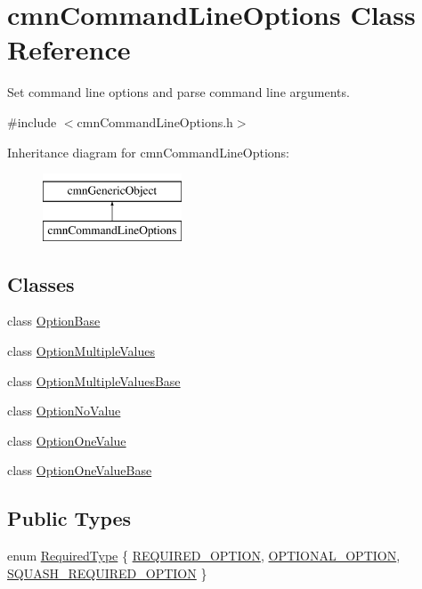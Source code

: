 \hypertarget{classcmn_command_line_options}{\section{cmn\-Command\-Line\-Options Class Reference}
\label{classcmn_command_line_options}
}


Set command line options and parse command line arguments.  




{\ttfamily \#include $<$cmn\-Command\-Line\-Options.\-h$>$}

Inheritance diagram for cmn\-Command\-Line\-Options\-:\begin{figure}[H]
\begin{center}
\leavevmode
\includegraphics[height=2.000000cm]{d7/de9/classcmn_command_line_options}
\end{center}
\end{figure}
\subsection*{Classes}
\begin{DoxyCompactItemize}
\item 
class \hyperlink{classcmn_command_line_options_1_1_option_base}{Option\-Base}
\item 
class \hyperlink{classcmn_command_line_options_1_1_option_multiple_values}{Option\-Multiple\-Values}
\item 
class \hyperlink{classcmn_command_line_options_1_1_option_multiple_values_base}{Option\-Multiple\-Values\-Base}
\item 
class \hyperlink{classcmn_command_line_options_1_1_option_no_value}{Option\-No\-Value}
\item 
class \hyperlink{classcmn_command_line_options_1_1_option_one_value}{Option\-One\-Value}
\item 
class \hyperlink{classcmn_command_line_options_1_1_option_one_value_base}{Option\-One\-Value\-Base}
\end{DoxyCompactItemize}
\subsection*{Public Types}
\begin{DoxyCompactItemize}
\item 
enum \hyperlink{classcmn_command_line_options_ac239a3ca62dd4e3b391824f6f1a97c76}{Required\-Type} \{ \hyperlink{classcmn_command_line_options_ac239a3ca62dd4e3b391824f6f1a97c76a18dad98cb48d91b0fe8ee13a54dc45ff}{R\-E\-Q\-U\-I\-R\-E\-D\-\_\-\-O\-P\-T\-I\-O\-N}, 
\hyperlink{classcmn_command_line_options_ac239a3ca62dd4e3b391824f6f1a97c76a6734a70bf0045a4c08605f3ae473d533}{O\-P\-T\-I\-O\-N\-A\-L\-\_\-\-O\-P\-T\-I\-O\-N}, 
\hyperlink{classcmn_command_line_options_ac239a3ca62dd4e3b391824f6f1a97c76a4078a310faff7e3930603320a15248f7}{S\-Q\-U\-A\-S\-H\-\_\-\-R\-E\-Q\-U\-I\-R\-E\-D\-\_\-\-O\-P\-T\-I\-O\-N}
 \}
\end{DoxyCompactItemize}
